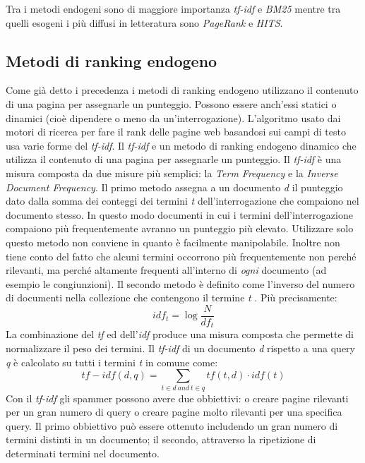 Tra i metodi endogeni sono di maggiore importanza \textit{tf-idf} e \textit{BM25} mentre tra quelli esogeni i più diffusi in letteratura sono \textit{PageRank} e \textit{HITS}.

\subsection{Metodi di ranking endogeno}
Come già detto i precedenza i metodi di ranking endogeno utilizzano il contenuto di una pagina per assegnarle un punteggio. Possono essere anch’essi statici o dinamici (cioè dipendere o meno da un’interrogazione). L'algoritmo usato dai motori di ricerca per fare il rank delle pagine web basandosi sui campi di testo usa varie forme del \textit{tf-idf}. Il \textit{tf-idf} e un metodo di ranking endogeno dinamico che utilizza il contenuto di una pagina per assegnarle un punteggio. Il \textit{tf-idf} è una misura composta da due misure più semplici: la \textit{Term Frequency} e la \textit{Inverse Document Frequency}. Il primo metodo assegna a un documento \textit{d} il punteggio dato dalla somma dei conteggi dei termini \textit{t} dell'interrogazione che compaiono nel documento stesso. In questo modo documenti in cui i termini dell'interrogazione compaiono più frequentemente avranno un punteggio più elevato. Utilizzare solo questo metodo non conviene in quanto è facilmente manipolabile. Inoltre non tiene conto del fatto che alcuni termini occorrono più frequentemente non perché rilevanti, ma perché altamente frequenti all'interno di \textit{ogni} documento (ad esempio le congiunzioni). Il secondo metodo è definito come l'inverso del numero di documenti nella collezione che contengono il termine \textit{t} \cite{Manning:2008:IIR:1394399p117}. Più precisamente:
\begin{equation}
 idf_t=\log\frac{N}{df_t}
 \label{eq:idf}
\end{equation}
La combinazione del \textit{tf} ed dell'\textit{idf} produce una misura composta che permette di normalizzare il peso dei termini. Il \textit{tf-idf} di un documento \textit{d} rispetto a una query \textit{q} è calcolato su tutti i termini \textit{t} in comune come:
\begin{equation}
 tf-idf(d,q)=\sum_{t \in d \: and \: t \in q} tf(t,d) \cdot idf(t)
\end{equation}
Con il \textit{tf-idf} gli spammer possono avere due obbiettivi: o creare pagine rilevanti per un gran numero di query o creare pagine molto rilevanti per una specifica query. Il primo obbiettivo può essere ottenuto includendo un gran numero di termini distinti in un documento; il secondo, attraverso la ripetizione di determinati termini nel documento.

